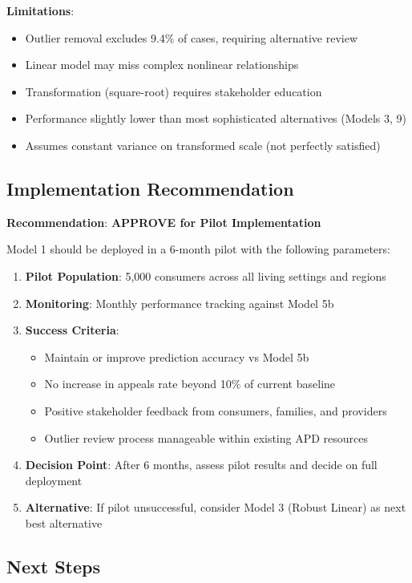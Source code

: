 \textbf{Limitations}:
\begin{itemize}
    \item Outlier removal excludes 9.4\% of cases, requiring alternative review
    \item Linear model may miss complex nonlinear relationships
    \item Transformation (square-root) requires stakeholder education
    \item Performance slightly lower than most sophisticated alternatives (Models 3, 9)
    \item Assumes constant variance on transformed scale (not perfectly satisfied)
\end{itemize}

\subsection{Implementation Recommendation}

\textbf{Recommendation}: \textbf{APPROVE for Pilot Implementation}

Model 1 should be deployed in a 6-month pilot with the following parameters:

\begin{enumerate}
    \item \textbf{Pilot Population}: 5,000 consumers across all living settings and regions
    \item \textbf{Monitoring}: Monthly performance tracking against Model 5b
    \item \textbf{Success Criteria}:
    \begin{itemize}
        \item Maintain or improve prediction accuracy vs Model 5b
        \item No increase in appeals rate beyond 10\% of current baseline
        \item Positive stakeholder feedback from consumers, families, and providers
        \item Outlier review process manageable within existing APD resources
    \end{itemize}
    \item \textbf{Decision Point}: After 6 months, assess pilot results and decide on full deployment
    \item \textbf{Alternative}: If pilot unsuccessful, consider Model 3 (Robust Linear) as next best alternative
\end{enumerate}

\subsection{Next Steps}

